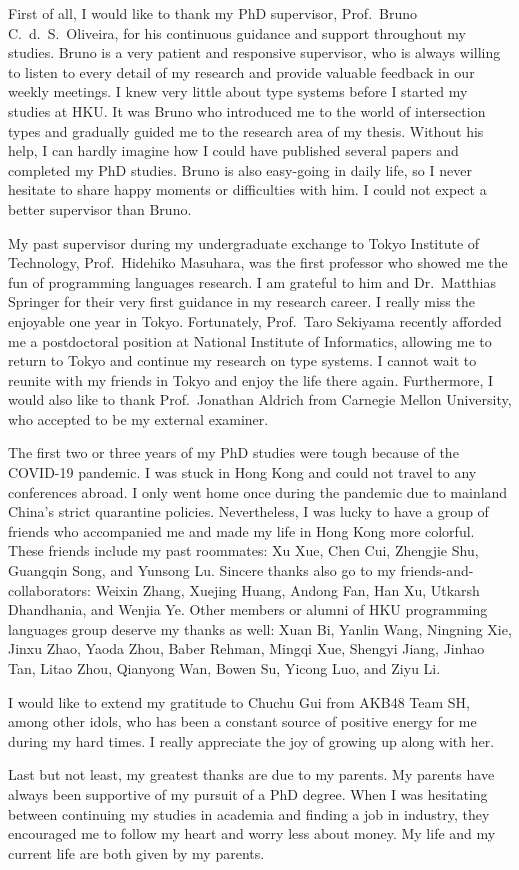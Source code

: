 First of all, I would like to thank my PhD supervisor, Prof.\ Bruno C.\ d.\ S.\
Oliveira, for his continuous guidance and support throughout my studies. Bruno
is a very patient and responsive supervisor, who is always willing to listen to
every detail of my research and provide valuable feedback in our weekly
meetings. I knew very little about type systems before I started my studies at
HKU. It was Bruno who introduced me to the world of intersection types and
gradually guided me to the research area of my thesis. Without his help, I can
hardly imagine how I could have published several papers and completed my PhD
studies. Bruno is also easy-going in daily life, so I never hesitate to share
happy moments or difficulties with him. I could not expect a better supervisor
than Bruno.

My past supervisor during my undergraduate exchange to Tokyo Institute of
Technology, Prof.\ Hidehiko Masuhara, was the first professor who showed me the
fun of programming languages research. I am grateful to him and Dr.\ Matthias
Springer for their very first guidance in my research career. I really miss the
enjoyable one year in Tokyo. Fortunately, Prof.\ Taro Sekiyama recently afforded
me a postdoctoral position at National Institute of Informatics, allowing me to
return to Tokyo and continue my research on type systems. I cannot wait to
reunite with my friends in Tokyo and enjoy the life there again. Furthermore, I
would also like to thank Prof.\ Jonathan Aldrich from Carnegie Mellon University,
who accepted to be my external examiner.

The first two or three years of my PhD studies were tough because of the COVID-19
pandemic. I was stuck in Hong Kong and could not travel to any conferences
abroad. I only went home once during the pandemic due to mainland China's
strict quarantine policies. Nevertheless, I was lucky to have a group of friends
who accompanied me and made my life in Hong Kong more colorful. These friends
include my past roommates: Xu Xue, Chen Cui, Zhengjie Shu, Guangqin Song, and
Yunsong Lu. Sincere thanks also go to my friends-and-collaborators: Weixin
Zhang, Xuejing Huang, Andong Fan, Han Xu, Utkarsh Dhandhania, and Wenjia Ye.
Other members or alumni of HKU programming languages group deserve my thanks as
well: Xuan Bi, Yanlin Wang, Ningning Xie, Jinxu Zhao, Yaoda Zhou, Baber Rehman,
Mingqi Xue, Shengyi Jiang, Jinhao Tan, Litao Zhou, Qianyong Wan, Bowen Su,
Yicong Luo, and Ziyu Li.

I would like to extend my gratitude to Chuchu Gui from AKB48 Team SH, among
other idols, who has been a constant source of positive energy for me during my
hard times. I really appreciate the joy of growing up along with her.

Last but not least, my greatest thanks are due to my parents. My parents have
always been supportive of my pursuit of a PhD degree. When I was hesitating
between continuing my studies in academia and finding a job in industry, they
encouraged me to follow my heart and worry less about money. My life and my
current life are both given by my parents.
